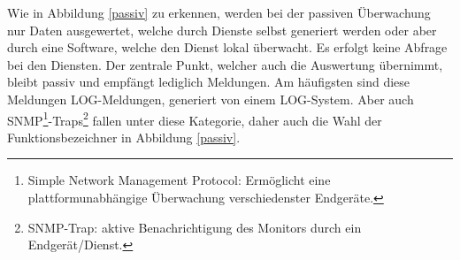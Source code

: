 Wie in Abbildung \ref{passiv} zu erkennen, werden bei der passiven Überwachung nur Daten
ausgewertet, welche durch Dienste selbst generiert werden oder aber durch eine Software, 
welche den Dienst lokal überwacht. Es erfolgt keine Abfrage bei den Diensten. Der 
zentrale Punkt, welcher auch die Auswertung übernimmt, bleibt passiv und empfängt 
lediglich Meldungen. Am häufigsten sind diese Meldungen LOG-Meldungen, generiert von 
einem LOG-System. Aber auch SNMP\footnote{Simple Network Management Protocol: 
Ermöglicht eine plattformunabhängige Überwachung verschiedenster 
Endgeräte.}-Traps\footnote{SNMP-Trap: aktive Benachrichtigung des Monitors durch ein 
Endgerät/Dienst.} fallen unter diese Kategorie, daher auch die Wahl der 
Funktionsbezeichner in Abbildung \ref{passiv}.